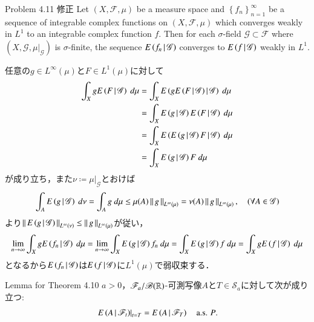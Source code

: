	\begin{itembox}[l]{Problem 4.11 修正}
		Let $(X,\mathscr{F},\mu)$ be a measure space and  
		$\left\{f_n\right\}_{n=1}^\infty$ be a sequence of integrable complex functions on $(X,\mathscr{F},\mu)$
		which converges weakly in $L^1$ to an integrable complex function $f$.
		Then for each $\sigma$-field $\mathscr{G} \subset \mathscr{F}$
		where $(X,\mathscr{G},\left.\mu\right|_{\mathscr{G}})$ is $\sigma$-finite,
		the sequence $E\left( f_n \, \middle|\, \mathscr{G} \right)$ converges to $E\left( f \, \middle|\, \mathscr{G} \right)$ weakly in $L^1$.
	\end{itembox}
	
	\begin{prf}
		任意の$g \in L^\infty(\mu)$と$F \in L^1(\mu)$に対して
		\begin{align}
			\int_X g\cexp{F}{\mathscr{G}}\ d\mu
			&= \int_X \cexp{g\cexp{F}{\mathscr{G}}}{\mathscr{G}}\ d\mu \\
			&= \int_X \cexp{g}{\mathscr{G}}\cexp{F}{\mathscr{G}}\ d\mu \\
			&= \int_X \cexp{\cexp{g}{\mathscr{G}}F}{\mathscr{G}}\ d\mu \\
			&= \int_X \cexp{g}{\mathscr{G}}F\ d\mu
		\end{align}
		が成り立ち，また$\nu \coloneqq \left.\mu\right|_{\mathscr{G}}$とおけば
		\begin{align}
			\int_A E\left( g \, \middle|\, \mathscr{G} \right)\ d\nu = \int_A g\ d\mu \leq \mu(A) \left\|\, g\, \right\|_{L^\infty(\mu)}
			= \nu(A) \left\|\, g\, \right\|_{L^\infty(\mu)},
			\quad (\forall A \in \mathscr{G})
		\end{align}
		より$\left\|\, E\left( g \, \middle|\, \mathscr{G} \right)\, \right\|_{L^\infty(\nu)} \leq \left\|\, g\, \right\|_{L^\infty(\mu)}$が従い，
		\begin{align}
			\lim_{n \to \infty} \int_X gE\left( f_n \, \middle|\, \mathscr{G} \right)\ d\mu
			= \lim_{n \to \infty} \int_X E\left( g \, \middle|\, \mathscr{G} \right)f_n\ d\mu
			= \int_X E\left( g \, \middle|\, \mathscr{G} \right)f\ d\mu
			= \int_X gE\left( f \, \middle|\, \mathscr{G} \right)\ d\mu
		\end{align}
		となるから$E\left( f_n \, \middle|\, \mathscr{G} \right)$は$E\left( f \, \middle|\, \mathscr{G} \right)$に$L^1(\mu)$で弱収束する．
		\QED
	\end{prf}
	
	\begin{itembox}[l]{Lemma for Theorem 4.10}
		$a > 0$，$\mathscr{F}_a/\mathscr{B}(\mathbb{R})$-可測写像$A$と$T \in \mathscr{S}_a$に対して次が成り立つ:
		\begin{align}
			\left. E\left( A \, \middle|\, \mathscr{F}_t \right) \right|_{t = T} = E\left( A \, \middle|\, \mathscr{F}_T \right)
			\quad \mbox{a.s. $P$}.
			\label{eq:lemma_for_theorem_4_10}
		\end{align}
	\end{itembox}
	

